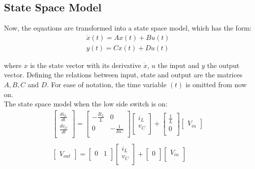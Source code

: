 \documentclass[]{article}
\begin{document}
\subsection{State Space Model}
Now, the equations are transformed into a state space model, which has the form:
\begin{equation}
	\begin{array}{l}
		\dot{x}(t) = Ax(t) + Bu(t) \\
		y(t) = Cx(t) + Du(t) 
	\end{array}
\end{equation}

where $x$ is the state vector with its derivative $\dot{x}$, $u$ the input and $y$ the output vector. Defining the relations between input, state and output are the matrices $A, B, C$ and $D$. For ease of notation, the time variable $(t)$ is omitted from now on. \\

The state space model when the low side switch is on:
\begin{equation}
	\begin{array}{l}
		\begin{bmatrix}
			\frac{di_{L}}{dt} \\
			\frac{dv_{C}}{dt} \\
		\end{bmatrix}
		=
		\begin{bmatrix}
			-\frac{R_{L}}{L} & 0 \\
			0 & -\frac{1}{RC} \\	
		\end{bmatrix}
		\begin{bmatrix}
			i_{L} \\
			v_{C} \\
		\end{bmatrix}
		+
		\begin{bmatrix}
			\frac{1}{L} \\
			0 \\	
		\end{bmatrix}
		\begin{bmatrix}
			V_{in}
		\end{bmatrix} 
		\\
		\\
		\begin{bmatrix}
			V_{out}
		\end{bmatrix} 
		=
		\begin{bmatrix}
			0 & 1 \\
		\end{bmatrix}
		\begin{bmatrix}
			i_{L} \\
			v_{C} \\
		\end{bmatrix}
		+
		\begin{bmatrix}
			0 \\
		\end{bmatrix}
		\begin{bmatrix}
			V_{in} \\
		\end{bmatrix}
	\end{array}
\end{equation}
\end{document}
